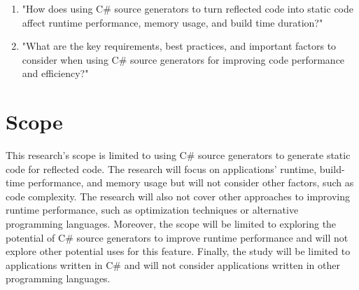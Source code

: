 \begin{enumerate}[label=\textbf{RQ.\arabic*}:, leftmargin=*, labelindent=1em]
    \item "How does using C\# source generators to turn reflected code into static code affect runtime performance, memory usage, and build time duration?"
    \item "What are the key requirements, best practices, and important factors to consider when using C\# source generators for improving code performance and efficiency?"
\end{enumerate}

\section{Scope}

This research's scope is limited to using C\# source generators to generate static code for reflected code. The research will focus on applications' runtime, build-time performance, and memory usage but will not consider other factors, such as code complexity. The research will also not cover other approaches to improving runtime performance, such as optimization techniques or alternative programming languages. Moreover, the scope will be limited to exploring the potential of C\# source generators to improve runtime performance and will not explore other potential uses for this feature. Finally, the study will be limited to applications written in C\# and will not consider applications written in other programming languages.
